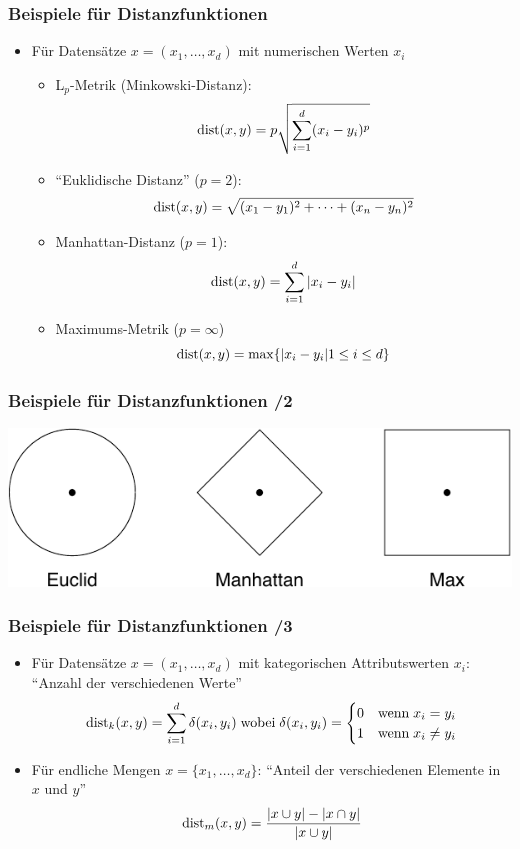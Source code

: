 \begin{frame}%
\frametitle{Beispiele für Distanzfunktionen}

\begin{itemize}
\item Für Datensätze $x= (x_1, \dots, x_d)$ mit numerischen Werten $x_i$  
\begin{itemize}
\item L$_p$-Metrik (Minkowski-Distanz): $$\operatorname{dist}(x, y) = p \sqrt{\sum_{i=1}^d (x_i - y_i)^p}$$
\item "`Euklidische Distanz"' ($p=2$): $$\operatorname{dist}(x, y) = \sqrt{(x_1 -
    y_1)^2 + \dots + (x_n - y_n)^2}$$
\item Manhattan-Distanz ($p=1$): $$\operatorname{dist}(x,y) = \sum_{i=1}^d|x_i - y_i|$$
\item Maximums-Metrik ($p = \infty$) $$\operatorname{dist}(x,y) = \max\{|x_i - y_i| 1 \leq i
    \leq d\} $$
\end{itemize}
\end{itemize}

\end{frame}

\begin{frame}%
\frametitle{Beispiele für Distanzfunktionen /2}

\begin{center}
\includegraphics[scale=1]{fig7/distance.pdf}
\end{center}

\end{frame}


\begin{frame}%
\frametitle{Beispiele für Distanzfunktionen /3}

\begin{itemize}
\item Für Datensätze $x= (x_1, \dots, x_d)$ mit kategorischen
  Attributswerten $x_i$:  
"`Anzahl der verschiedenen Werte"'
$$\operatorname{dist}_k(x,y)=\sum_{i=1}^d \delta(x_i,
y_i)\;\text{wobei}\;\delta(x_i,y_i) = 
\begin{cases}
0 & \text{wenn}\; x_i=y_i \\
1 & \text{wenn}\; x_i\neq y_i 
\end{cases}$$
\item Für endliche Mengen $x= \{x_1, \dots, x_d\}$: "`Anteil der
  verschiedenen Elemente in $x$ und $y$"'  
$$\operatorname{dist}_m(x, y) = \frac{|x \cup y| - |x \cap y|}{|x \cup y|}$$
\end{itemize}
\end{frame}

